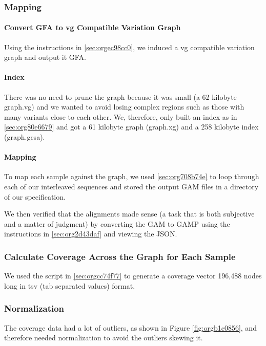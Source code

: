 \documentclass[10pt, a4paper]{article}
\begin{document}
\subsubsection{Mapping}
\label{sec:org12bdfb4}
\paragraph{Convert GFA to vg Compatible Variation Graph}
\label{sec:orga631fc6}
Using the instructions in \ref{sec:orgec98cc0}, we induced a vg 
\cite{garrisonVariationGraphToolkit2018} compatible variation graph and output it 
GFA.

\paragraph{Index}
\label{sec:orgebec44a}
There was no need to prune the graph because it was small 
(a 62 kilobyte graph.vg) and we wanted to avoid losing complex regions such as 
those with many variants close to each other.
We, therefore, only built an index as in \ref{sec:org80e6679} and got a 61
kilobyte graph (graph.xg) and a 258 kilobyte index (graph.gcsa).

\paragraph{Mapping}
\label{sec:orgde1cad1}
To map each sample against the graph, we used \ref{sec:org708b74e} to loop through 
each of our interleaved sequences and stored the output GAM files in a 
directory of our specification.

We then verified that the alignments made sense
(a task that is both subjective and a matter of judgment) by converting the GAM 
to GAMP using the instructions in  \ref{sec:org2d43daf} and viewing the JSON.

\subsubsection{Calculate Coverage Across the Graph for Each Sample}
\label{sec:org58d46dc}
We used the script in \ref{sec:orgcc74f77} to generate a coverage vector 196,488 nodes
long in tsv (tab separated values) format.

\subsubsection{Normalization}
\label{sec:org57e0efe}
The coverage data had a lot of outliers, as shown in Figure
\ref{fig:orgb1c0856}, and therefore needed normalization to avoid the outliers
skewing it.
\end{document}
